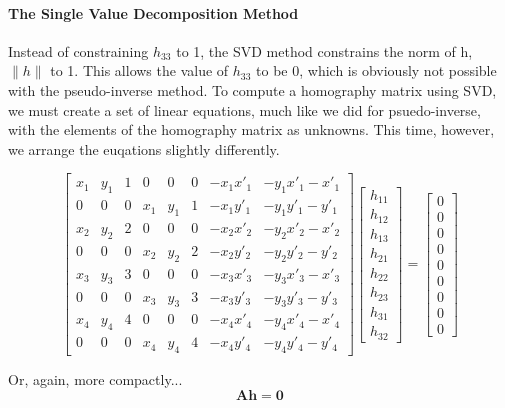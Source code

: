 \documentclass[11pt, letterpaper]{article}
\begin{document}
\paragraph{The Single Value Decomposition Method}
Instead of constraining $h_{33}$ to 1, the SVD method constrains the
norm of h, $\|h\|$ to 1. This allows the value of $h_{33}$ to be 0,
which is obviously not possible with the pseudo-inverse method. To
compute a homography matrix using SVD, we must create a set of linear
equations, much like we did for psuedo-inverse, with the elements of
the homography matrix as unknowns. This time, however, we arrange the
euqations slightly differently.

\[
\begin{bmatrix}
  x_1 & y_1 & 1 & 0 & 0 & 0 & -x_1x'_1 & -y_1x'_1 -x'_1 \\
  0 & 0 & 0 & x_1 & y_1 & 1 & -x_1y'_1 & -y_1y'_1 -y'_1 \\
  x_2 & y_2 & 2 & 0 & 0 & 0 & -x_2x'_2 & -y_2x'_2 -x'_2 \\
  0 & 0 & 0 & x_2 & y_2 & 2 & -x_2y'_2 & -y_2y'_2 -y'_2 \\
  x_3 & y_3 & 3 & 0 & 0 & 0 & -x_3x'_3 & -y_3x'_3 -x'_3 \\
  0 & 0 & 0 & x_3 & y_3 & 3 & -x_3y'_3 & -y_3y'_3 -y'_3 \\
  x_4 & y_4 & 4 & 0 & 0 & 0 & -x_4x'_4 & -y_4x'_4 -x'_4 \\
  0 & 0 & 0 & x_4 & y_4 & 4 & -x_4y'_4 & -y_4y'_4 -y'_4
\end{bmatrix}
\begin{bmatrix}
  h_{11} \\ h_{12} \\ h_{13} \\ h_{21} \\ h_{22} \\ h_{23} \\ h_{31} \\ h_{32} 
\end{bmatrix}
=
\begin{bmatrix}
  0 \\   0 \\   0 \\   0 \\   0 \\   0 \\   0 \\   0 \\   0 
\end{bmatrix}
\]

Or, again, more compactly...
\[
\mathbf{A}\mathbf{h}=\mathbf{0}
\]
\end{document}
